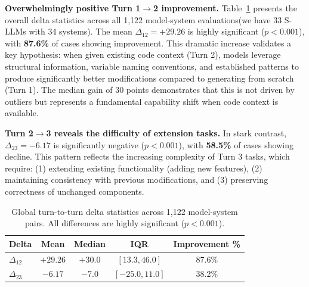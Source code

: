 \documentclass{ieeeaccess}
\begin{document}
\textbf{Overwhelmingly positive Turn 1$\to$2 improvement.}
Table~\ref{tab:delta_global} presents the overall delta statistics across all 1,122 model-system evaluations(we have 33 S-LLMs with 34 systems). The mean $\Delta_{12} = +29.26$ is highly significant ($p < 0.001$), with \textbf{87.6\%} of cases showing improvement. This dramatic increase validates a key hypothesis: when given existing code context (Turn 2), models leverage structural information, variable naming conventions, and established patterns to produce significantly better modifications compared to generating from scratch (Turn 1). The median gain of 30 points demonstrates that this is not driven by outliers but represents a fundamental capability shift when code context is available.

\textbf{Turn 2$\to$3 reveals the difficulty of extension tasks.}
In stark contrast, $\Delta_{23} = -6.17$ is significantly negative ($p < 0.001$), with \textbf{58.5\%} of cases showing decline. This pattern reflects the increasing complexity of Turn 3 tasks, which require: (1) extending existing functionality (adding new features), (2) maintaining consistency with previous modifications, and (3) preserving correctness of unchanged components.

\begin{table}[htbp]
    \centering
    \caption{Global turn-to-turn delta statistics across 1,122 model-system pairs. All differences are highly significant ($p < 0.001$).}
    \label{tab:delta_global}
    \begin{tabular}{lcccc}
    \toprule
    \textbf{Delta} & \textbf{Mean} & \textbf{Median} & \textbf{IQR} & \textbf{Improvement \%} \\
    \midrule
    $\Delta_{12}$ & $+29.26 $ & $+30.0$ & $[13.3, 46.0]$ & 87.6\% \\
    $\Delta_{23}$ & $-6.17 $ & $-7.0$ & $[-25.0, 11.0]$ & 38.2\% \\
    \bottomrule
    \end{tabular}
\end{table}
\end{document}
